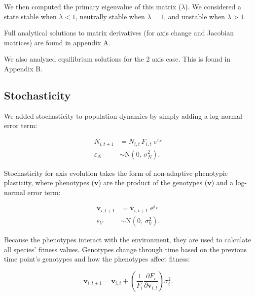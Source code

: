 \noindent We then computed the primary eigenvalue of this matrix ($\lambda$).
We considered a state stable when $\lambda < 1$,
neutrally stable when $\lambda = 1$,
and unstable when $\lambda > 1$.

Full analytical solutions to matrix derivatives (for axis change and
Jacobian matrices) are found in appendix A.

We also analyzed equilibrium solutions for the 2 axis case.
This is found in Appendix B.


\subsection*{Stochasticity}

We added stochasticity to population dynamics by simply adding 
a log-normal error term:

\begin{equation} \label{eq:N-stochasticity}
\begin{split}
    N_{i,t+1} &= N_{i,t} \, F_{i,t} \; \text{e}^{\varepsilon_N} \\
    \varepsilon_N &\sim \text{N}(0, \, \sigma^2_N)
    \text{.}
\end{split}
\end{equation}


Stochasticity for axis evolution takes the form of non-adaptive
phenotypic plasticity,
where phenotypes ($\mathbf{\ddot{v}}$) are the product of the
genotypes ($\mathbf{v}$) and a log-normal error term:

\begin{equation} \label{eq:V-stochasticity}
\begin{split}
    \mathbf{\ddot{v}}_{i,t+1} &= \mathbf{v}_{i,t+1} \; \text{e}^{\varepsilon_V} \\
    \varepsilon_V &\sim \text{N}(0, \, \sigma^2_V)
    \text{.}
\end{split}
\end{equation}


Because the phenotypes interact with the environment, they are used
to calculate all species' fitness values.
Genotypes change through time based on the previous time point's 
genotypes and how the phenotypes affect fitness:

\begin{equation} \label{eq:axis-change-stochastic}
    \mathbf{v}_{i,t+1} = \mathbf{v}_{i,t} + \left( \frac{1}{F_i}
        \frac{\partial F_i}{\partial \mathbf{\ddot{v}}_{i,t}} \right) \sigma^2_i
    \textrm{.}
\end{equation}





